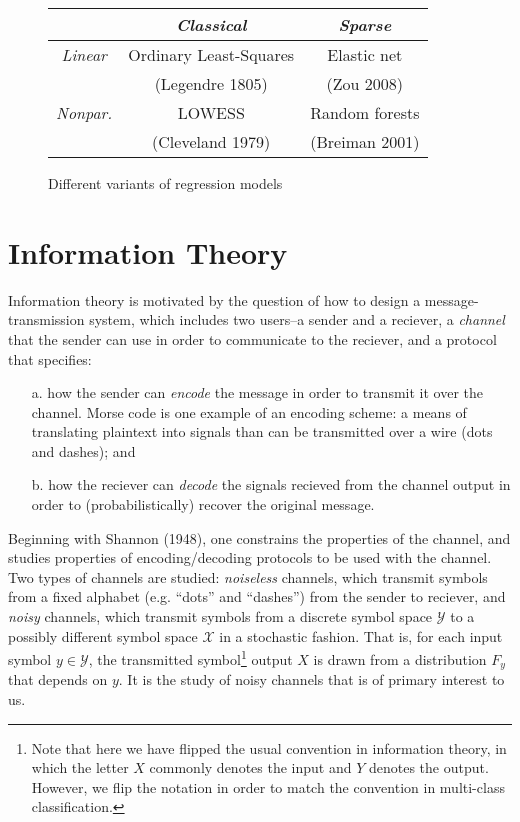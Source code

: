 \begin{figure}
\centering
\begin{tabular}{c|c|c|}
 & \emph{Classical} & \emph{Sparse} \\ \hline
 \emph{Linear} & Ordinary Least-Squares  & Elastic net \\ 
  & (Legendre 1805) & (Zou 2008)  \\\hline
 \emph{Nonpar.} & LOWESS  & Random forests  \\ 
   & (Cleveland 1979) & (Breiman 2001)  \\\hline
\end{tabular}
\caption{Different variants of regression models}
\label{tab:regression}
\end{figure}

\section{Information Theory}\label{sec:intro_mi}


Information theory is motivated by the question of how to design a
message-transmission system, which includes two users--a sender and a
reciever, a \emph{channel} that the sender can use in order to
communicate to the reciever, and a protocol that specifies:
\begin{itemize}
\item[a.] how the sender can \emph{encode} the message in order to
  transmit it over the channel.  Morse code is one example of an
  encoding scheme: a means of translating plaintext into signals than
  can be transmitted over a wire (dots and dashes); and
\item[b.] how the reciever can \emph{decode} the signals recieved from
  the channel output in order to (probabilistically) recover the
  original message.
\end{itemize}

Beginning with Shannon (1948), one constrains the properties of the
channel, and studies properties of encoding/decoding protocols to be
used with the channel.  Two types of channels are studied:
\emph{noiseless} channels, which transmit symbols from a fixed
alphabet (e.g. ``dots'' and ``dashes'') from the sender to reciever,
and \emph{noisy} channels, which transmit symbols from a discrete
symbol space $\mathcal{Y}$ to a possibly different symbol space
$\mathcal{X}$ in a stochastic fashion.  That is, for each input symbol
$y \in \mathcal{Y}$, the transmitted symbol\footnote{Note that here we
  have flipped the usual convention in information theory, in which
  the letter $X$ commonly denotes the input and $Y$ denotes the
  output.  However, we flip the notation in order to match the
  convention in multi-class classification.} output $X$ is drawn from a
distribution $F_y$ that depends on $y$.  It is the study of
noisy channels that is of primary interest to us.

